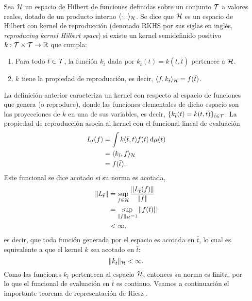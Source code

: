 \begin{definition}
	Sea \(\mathcal{H}\) un espacio de Hilbert de funciones definidas sobre un conjunto \(\mathcal{T}\) a valores reales, dotado de un producto interno \(\langle \cdot, \cdot \rangle_{\mathcal{H}}\). Se dice que \(\mathcal{H}\) es un espacio de Hilbert con kernel de reproducción (denotado RKHS por sus siglas en inglés, \emph{reproducing kernel Hilbert space}) si existe un kernel semidefinido positivo \(k : \mathcal{T} \times \mathcal{T} \to \mathbb{R}\) que cumpla:
	\begin{enumerate}
		\item Para todo \(\bar{t} \in \mathcal{T}\), la función \(k_{\bar{t}}\) dada por  \(k_{\bar{t}}(t) = k(t, \bar{t})\) pertenece a \(\mathcal{H}\).
		\item \(k\) tiene la propiedad de reproducción, es decir, \(\langle f, k_{\bar{t}} \rangle_{\mathcal{H}} = f(\bar{t})\).
	\end{enumerate}
\end{definition}

La definición anterior caracteriza un kernel con respecto al espacio de funciones que genera (o reproduce), donde las funciones elementales de dicho espacio son las proyecciones de \(k\) en una de sus variables, es decir, \(\{ k_{\bar{t}}(t) = k(t, \bar{t})\}_{\bar{t} \in \mathcal{T}}\). La propiedad de reproducción asocia al kernel con el funcional lineal de evaluación
\begin{align*}
	L_{\bar{t}}(f)	&= \int k(\bar{t}, t) f(t) \dd{\mu(t)} \\
					&= \langle k_{\bar{t}}, f\rangle_{\mathcal{H}} \\
					&= f(\bar{t}).
\end{align*}
Este funcional se dice acotado si su norma es acotada,
\begin{align*}
	\Vert L_{\bar{t}} \Vert	&= \sup_{f \in \mathcal{H}} \frac{\Vert L_{\bar{t}}(f) \Vert}{\Vert f \Vert } \\
							&= \sup_{\Vert f \Vert_{\mathcal{H}} = 1} \Vert f(\bar{t}) \Vert\\
							&< \infty,
\end{align*}
es decir, que toda función generada por el espacio es acotada en \(\bar{t}\), lo cual es equivalente a que el kernel \(k\) sea acotado en \(\bar{t}\):
\begin{equation*}
	\Vert k_{\bar{t}}\Vert_{\mathcal{H}} < \infty.
\end{equation*}
Como las funciones \(k_{\bar{t}}\) pertenecen al espacio \(\mathcal{H}\), entonces su norma es finita, por lo que el funcional de evaluación en \(\bar{t}\) es continuo. Veamos a continuación el importante teorema de representación de Riesz \cite{friedman1982foundations}.

